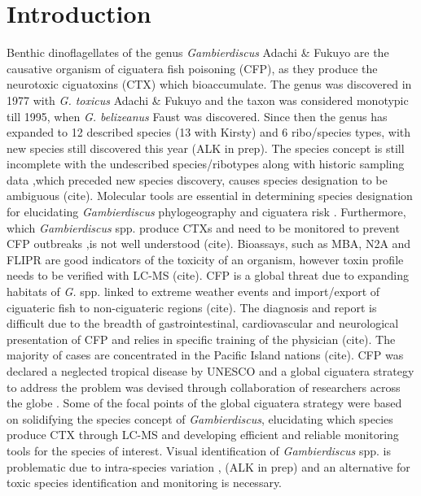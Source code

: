 \documentclass[12pt]{article}
\begin{document}
\section{Introduction}
Benthic dinoflagellates of the genus \emph{Gambierdiscus} Adachi \& Fukuyo are the causative organism of ciguatera fish poisoning (CFP), as they produce the neurotoxic ciguatoxins (CTX) which bioaccumulate. The genus was discovered in 1977 with \emph{G. toxicus} Adachi \& Fukuyo and the taxon was considered monotypic till 1995, when \emph{G. belizeanus} Faust was discovered. Since then the genus has expanded to 12 described species (13 with Kirsty) and 6 ribo/species types, with new species still discovered this year (ALK in prep). The species concept is still incomplete with the undescribed species/ribotypes along with historic sampling data ,which preceded new species discovery, causes species designation to be ambiguous (cite). Molecular tools are essential in determining species designation for elucidating \emph{Gambierdiscus} phylogeography  and ciguatera risk \cite{litaker2010global}. Furthermore, which \emph{Gambierdiscus} spp. produce CTXs and need to be monitored to prevent CFP outbreaks ,is not well understood (cite). Bioassays, such as MBA, N2A and FLIPR are good indicators of the toxicity of an organism, however toxin profile needs to be verified with LC-MS (cite).
CFP is a global threat due to expanding habitats of \emph{G.} spp. linked to extreme weather events and import/export of ciguateric fish to non-ciguateric regions (cite). The diagnosis and report is difficult due to the breadth of gastrointestinal, cardiovascular and neurological presentation of CFP and relies in specific training of the physician (cite). The majority of cases are concentrated in the Pacific Island nations (cite). CFP was declared a neglected tropical disease by UNESCO and a global ciguatera strategy to address the problem was devised through collaboration of researchers across the globe \cite{globalcig}. Some of the focal points of the global ciguatera strategy were based on solidifying the species concept of \emph{Gambierdiscus}, elucidating which species produce CTX through LC-MS and developing efficient and reliable monitoring tools for the species of interest. Visual identification of \emph{Gambierdiscus} spp. is problematic due to intra-species variation \cite{kohli2014high}, (ALK in prep) and an alternative for toxic species identification and monitoring is necessary.\\
\end{document}
